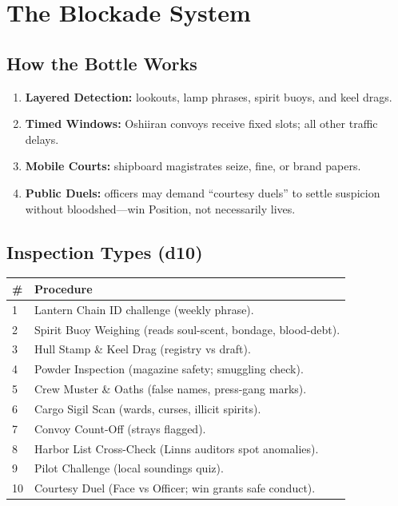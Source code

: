 \documentclass[11pt,oneside]{book}
\begin{document}
\section{The Blockade System}
\subsection*{How the Bottle Works}
\begin{enumerate}
  \item \textbf{Layered Detection:} lookouts, lamp phrases, spirit buoys, and keel drags.
  \item \textbf{Timed Windows:} Oshiiran convoys receive fixed slots; all other traffic delays.
  \item \textbf{Mobile Courts:} shipboard magistrates seize, fine, or brand papers.
  \item \textbf{Public Duels:} officers may demand ``courtesy duels'' to settle suspicion without bloodshed---win Position, not necessarily lives.
\end{enumerate}

\subsection*{Inspection Types (d10)}
\begin{tabularx}{\linewidth}{@{}p{0.7cm} X@{}}
\toprule
\# & \textbf{Procedure}\\
\midrule
1 & Lantern Chain ID challenge (weekly phrase).\\
2 & Spirit Buoy Weighing (reads soul-scent, bondage, blood-debt).\\
3 & Hull Stamp \& Keel Drag (registry vs draft).\\
4 & Powder Inspection (magazine safety; smuggling check).\\
5 & Crew Muster \& Oaths (false names, press-gang marks).\\
6 & Cargo Sigil Scan (wards, curses, illicit spirits).\\
7 & Convoy Count-Off (strays flagged).\\
8 & Harbor List Cross-Check (Linns auditors spot anomalies).\\
9 & Pilot Challenge (local soundings quiz).\\
10 & Courtesy Duel (Face vs Officer; win grants safe conduct).\\
\bottomrule
\end{tabularx}
\end{document}
